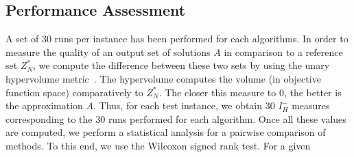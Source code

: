 \documentclass{llncs}
\begin{document}
\subsection{Performance Assessment}
 A set of 30 runs per instance has been performed for each algorithms. %
In order to measure the quality of an output set of solutions $A$ in comparison to a reference set $Z^*_N$, we compute the difference between these two sets by using the unary hypervolume
metric~\cite{Zitzler2004}. The hypervolume computes the volume (in objective function space) comparatively to $Z^*_N$. The closer this measure to 0, the better is the approximation $A$.
Thus, for each test instance, we obtain 30 $I^-_H $ measures  corresponding to the 30  runs performed for each algorithm. 
Once all these values are computed, we perform a statistical analysis for a pairwise comparison of methods. To this end, we use the Wilcoxon signed rank test. For a given
\end{document}
